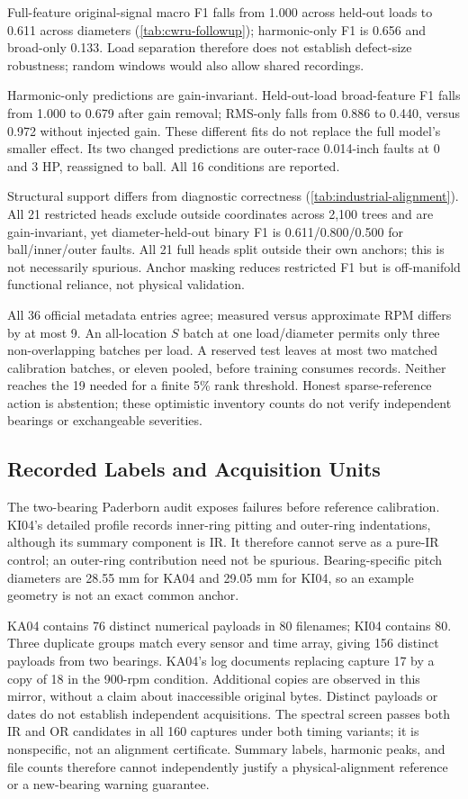 \documentclass[conference]{IEEEtran}
\begin{document}
Full-feature original-signal macro F1 falls from 1.000 across held-out loads to 0.611 across diameters (\cref{tab:cwru-followup}); harmonic-only F1 is 0.656 and broad-only 0.133. Load separation therefore does not establish defect-size robustness; random windows would also allow shared recordings.

Harmonic-only predictions are gain-invariant. Held-out-load broad-feature F1 falls from 1.000 to 0.679 after gain removal; RMS-only falls from 0.886 to 0.440, versus 0.972 without injected gain. These different fits do not replace the full model's smaller effect. Its two changed predictions are outer-race 0.014-inch faults at 0 and 3 HP, reassigned to ball. All 16 conditions are reported.

Structural support differs from diagnostic correctness (\cref{tab:industrial-alignment}). All 21 restricted heads exclude outside coordinates across 2,100 trees and are gain-invariant, yet diameter-held-out binary F1 is 0.611/0.800/0.500 for ball/inner/outer faults. All 21 full heads split outside their own anchors; this is not necessarily spurious. Anchor masking reduces restricted F1 but is off-manifold functional reliance, not physical validation.

All 36 official metadata entries agree; measured versus approximate RPM differs by at most 9. An all-location $S$ batch at one load/diameter permits only three non-overlapping batches per load. A reserved test leaves at most two matched calibration batches, or eleven pooled, before training consumes records. Neither reaches the 19 needed for a finite 5\% rank threshold. Honest sparse-reference action is abstention; these optimistic inventory counts do not verify independent bearings or exchangeable severities.

\subsection{Recorded Labels and Acquisition Units}
The two-bearing Paderborn audit exposes failures before reference calibration. KI04's detailed profile records inner-ring pitting and outer-ring indentations, although its summary component is IR. It therefore cannot serve as a pure-IR control; an outer-ring contribution need not be spurious. Bearing-specific pitch diameters are 28.55 mm for KA04 and 29.05 mm for KI04, so an example geometry is not an exact common anchor.

KA04 contains 76 distinct numerical payloads in 80 filenames; KI04 contains 80. Three duplicate groups match every sensor and time array, giving 156 distinct payloads from two bearings. KA04's log documents replacing capture 17 by a copy of 18 in the 900-rpm condition. Additional copies are observed in this mirror, without a claim about inaccessible original bytes. Distinct payloads or dates do not establish independent acquisitions. The spectral screen passes both IR and OR candidates in all 160 captures under both timing variants; it is nonspecific, not an alignment certificate. Summary labels, harmonic peaks, and file counts therefore cannot independently justify a physical-alignment reference or a new-bearing warning guarantee.
\end{document}
